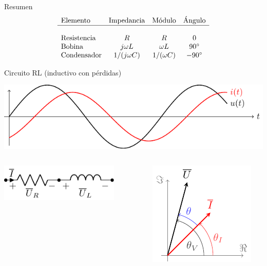 \documentclass[aspectratio=169, usenames,svgnames,dvipsnames]{beamer}
\begin{document}
\begin{frame}[label={sec:org895a008}]{Resumen}
\[
  \begin{array}{lccc}
    \text{Elemento} & \text{Impedancia} & \text{Módulo} & \text{Ángulo}\\
    \hline\\
    \text{Resistencia} & R & R & 0\\
    \text{Bobina} & j \omega L & \omega L & \ang{90}\\
     \text{Condensador} & 1/(j \omega C) & 1/(\omega C) & \ang{-90}\\
  \end{array}
\]
\end{frame}
\begin{frame}[label={sec:orgda1e210}]{Circuito RL (inductivo con pérdidas)}
\begin{center}
\includegraphics[height=0.25\textheight]{../figs/inductivo.pdf}
\end{center}
\begin{columns}
\begin{column}{0.45\columnwidth}
\begin{center}
\includegraphics[width=0.8\textwidth]{../figs/RL.pdf}
\end{center}
\end{column}


\begin{column}{0.55\columnwidth}
\begin{center}
\includegraphics[height=0.5\textheight]{../figs/fasorInductanciaReal_VI.pdf}
\end{center}
\end{column}
\end{columns}
\end{frame}
\end{document}
